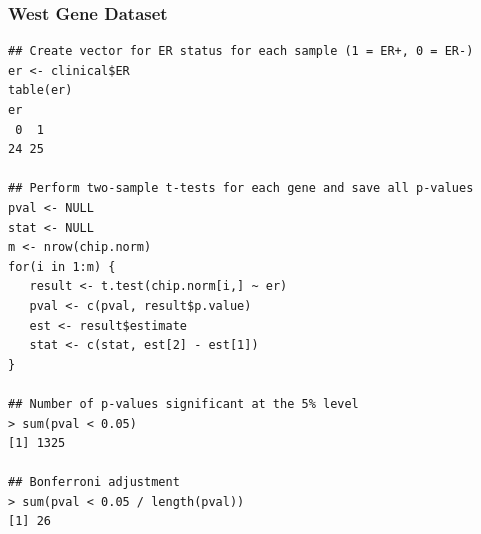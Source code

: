 \documentclass[11pt]{beamer}
\begin{document}
\begin{frame}[fragile]
\frametitle{West Gene Dataset}
{
\begin{lstlisting}
## Create vector for ER status for each sample (1 = ER+, 0 = ER-)
er <- clinical$ER
table(er)
er
 0  1 
24 25 

## Perform two-sample t-tests for each gene and save all p-values
pval <- NULL
stat <- NULL
m <- nrow(chip.norm)
for(i in 1:m) {
   result <- t.test(chip.norm[i,] ~ er)
   pval <- c(pval, result$p.value)
   est <- result$estimate
   stat <- c(stat, est[2] - est[1])
}

## Number of p-values significant at the 5% level
> sum(pval < 0.05)
[1] 1325

## Bonferroni adjustment
> sum(pval < 0.05 / length(pval))
[1] 26
\end{lstlisting}
}
\end{frame}
\end{document}
